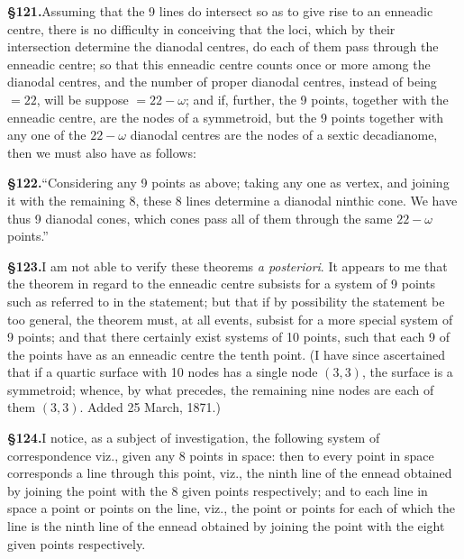 \documentclass[11pt,a4paper]{article}
\begin{document}
\textbf{\S 121.}\quad Assuming that the 9 lines do intersect so as to give rise to an enneadic centre, there is no difficulty in conceiving that the loci, which by their intersection determine the dianodal centres, do each of them pass through the enneadic centre; so that this enneadic centre counts once or more among the dianodal centres, and the number of proper dianodal centres, instead of being $= 22$, will be suppose $= 22 - \omega$; and if, further, the 9 points, together with the enneadic centre, are the nodes of a symmetroid, but the 9 points together with any one of the $22 - \omega$ dianodal centres are the nodes of a sextic decadianome, then we must also have as follows:

\textbf{\S 122.}\quad ``Considering any 9 points as above; taking any one as vertex, and joining it with the remaining 8, these 8 lines determine a dianodal ninthic cone. We have thus 9 dianodal cones, which cones pass all of them through the same $22 - \omega$ points.''

\textbf{\S 123.}\quad I am not able to verify these theorems \textit{a posteriori}. It appears to me that the theorem in regard to the enneadic centre subsists for a system of 9 points such as referred to in the statement; but that if by possibility the statement be too general, the theorem must, at all events, subsist for a more special system of 9 points; and that there certainly exist systems of 10 points, such that each 9 of the points have as an enneadic centre the tenth point. (I have since ascertained that if a quartic surface with 10 nodes has a single node $(3, 3)$, the surface is a symmetroid; whence, by what precedes, the remaining nine nodes are each of them $(3, 3)$. Added 25 March, 1871.)

\textbf{\S 124.}\quad I notice, as a subject of investigation, the following system of correspondence viz., given any 8 points in space: then to every point in space corresponds a line through this point, viz., the ninth line of the ennead obtained by joining the point with the 8 given points respectively; and to each line in space a point or points on the line, viz., the point or points for each of which the line is the ninth line of the ennead obtained by joining the point with the eight given points respectively.

\clearpage

\end{document}
